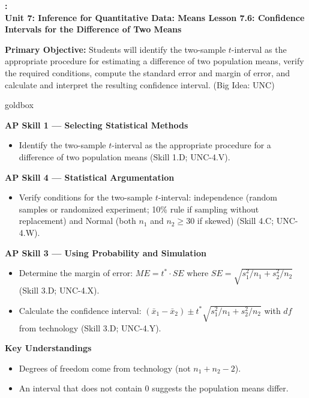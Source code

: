 \documentclass[10pt]{article}
\newcommand{\UnitNumberName}{Unit 7: Inference for Quantitative Data: Means \quad}
\newcommand{\LessonNumberName}{Lesson 7.6: Confidence Intervals for the Difference of Two Means}
\begin{document}
\begin{center}
    {\Large\bfseries \CourseName: \SchoolYear \\
    {\small\bfseries \UnitNumberName \LessonNumberName}}
\end{center}

\begin{tcolorbox}[colback=sky, colframe=navy, boxrule=0.9pt, arc=2mm,
    left=2mm, right=2mm, top=1.5mm, bottom=1.5mm]
    \textbf{Primary Objective:} Students will identify the two-sample $t$-interval as the
    appropriate procedure for estimating a difference of two population means, verify the
    required conditions, compute the standard error and margin of error, and calculate and
    interpret the resulting confidence interval.
    (Big Idea: UNC)
\end{tcolorbox}

\renewcommand{\arraystretch}{1.6}
\begin{skillbox}{goldbox}
\begin{minipage}[t]{0.48\linewidth}
    \textbf{AP Skill 1 --- Selecting Statistical Methods}
    \begin{itemize}
        \item Identify the two-sample $t$-interval as the appropriate procedure for a
              difference of two population means (Skill 1.D; UNC-4.V).
    \end{itemize}
    \textbf{AP Skill 4 --- Statistical Argumentation}
    \begin{itemize}
        \item Verify conditions for the two-sample $t$-interval: independence (random
              samples or randomized experiment; 10\% rule if sampling without replacement)
              and Normal (both $n_1$ and $n_2 \ge 30$ if skewed) (Skill 4.C; UNC-4.W).
    \end{itemize}
\end{minipage}
\hfill
\begin{minipage}[t]{0.48\linewidth}
    \textbf{AP Skill 3 --- Using Probability and Simulation}
    \begin{itemize}
        \item Determine the margin of error: $ME = t^* \cdot SE$ where
              $SE = \sqrt{s_1^2/n_1 + s_2^2/n_2}$ (Skill 3.D; UNC-4.X).
        \item Calculate the confidence interval:
              $(\bar x_1 - \bar x_2) \pm t^*\sqrt{s_1^2/n_1 + s_2^2/n_2}$
              with $df$ from technology (Skill 3.D; UNC-4.Y).
    \end{itemize}
    \textbf{Key Understandings}
    \begin{itemize}
        \item Degrees of freedom come from technology (not $n_1 + n_2 - 2$).
        \item An interval that does not contain 0 suggests the population means differ.
    \end{itemize}
\end{minipage}
\end{skillbox}
\end{document}
